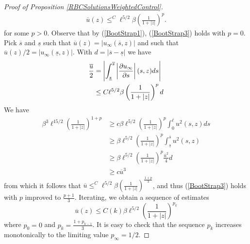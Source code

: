 \documentclass{amsart}
\newcommand{\ol}{\overline}
\begin{document}
\begin{proof}[Proof of Proposition \ref{RBCSolutionsWeightedControl}]
\begin{align} \label{BootStrap3}
\ol{u}(z) \leq^C \ell^{5/2} \beta \left(\frac{1}{1  + |z|}\right)^{p}.
\end{align}
for some $p > 0$. Observe that by (\ref{BootStrap1}), (\ref{BootStrap3}) holds with $p = 0$. Pick $\overline{s}$ and $\underline{s}$ such that $\ol{u}(z) = \left|u_{\infty}(\overline{s}, z)\right|$ and such that  $\ol{u}(z)/2 = \left|u_{\infty}(\underline{s}, z)\right|$. With $d =  |\overline{s} - \underline{s}|$  we have
\begin{align}\label{Bootstrap2}
\frac{\ol{u}}{2} & = \left|\int_{\underline{s}}^{\overline{s}} \left| \frac{\partial u_{\infty}}{\partial s} \right|(s, z) ds \right| \\
& \leq C \ell^{5/2} \beta \left(\frac{1}{1  + |z|} \right)^p  d\notag
\end{align}
We have
\begin{align*}
\beta^3\ell^{15/2}\left(\frac{1}{1  + |z|}\right)^{1 + p} &\geq c \beta \ell^{5/2} \left(\frac{1}{1  + |z|} \right)^p \int_0^\ell u^2 (s, z) ds \\
& \geq \beta \ell^{5/2} \left(\frac{1}{1  + |z|} \right)^p \int_{\underline{s}}^{\overline{s}}  u^2 (s, z) \\
& \geq \beta \ell^{5/2} \left(\frac{1}{1  + |z|} \right)^p \frac{\ol{u}^2}{4} d\\
& \geq c \ol{u}^3
\end{align*}
from which it follows that $\ol{u} \leq^C \ell^{5/2} \beta \left(\frac{1}{1 + |z|}\right)^{\frac{1 + p}{3}}$, and thus (\ref{BootStrap3}) holds with $p$ improved to $\frac{p + 1}{3}$. Iterating, we obtain a sequence of estimates
\[
\ol{u}(z) \leq C(k)\beta \ell^{5/2}\left(\frac{1}{1 + |z|}\right)^{p_k}
\]
where $p_0 = 0$ and $p_{k} = \frac{1 + p_{k - 1}}{3}$. It is easy to check that the sequence $p_{k}$ increases monotonically to the limiting value $p_\infty = 1/2$.
\end{proof}
\end{document}
